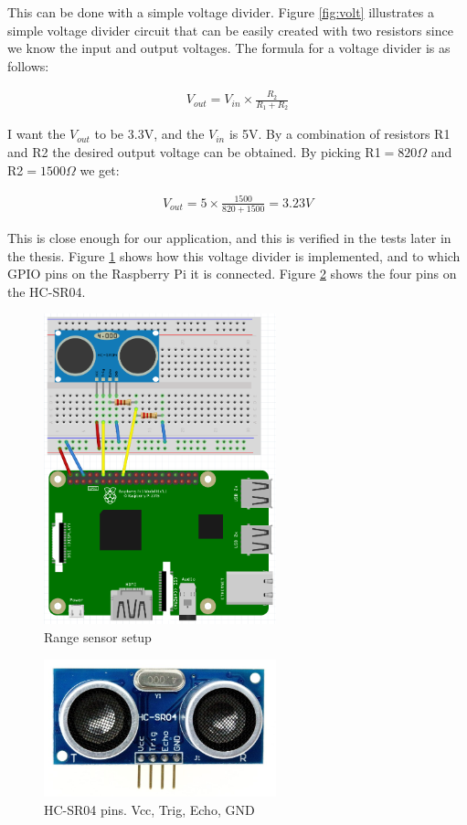This can be done with a simple voltage divider. Figure \ref{fig:volt} illustrates a simple voltage divider circuit that can be easily created with two resistors since we know the input and output voltages. The formula for a voltage divider is as follows:

\begin{align}
V_{out} = V_{in}\times \frac{R_2}{R_1 + R_2}
\end{align}

I want the $V_{out}$ to be 3.3V, and the $V_{in}$ is 5V. By a combination of resistors R1 and R2 the desired output voltage can be obtained. By picking R1$ = 820\Omega$ and R2$ = 1500\Omega$ we get:

\begin{align*}
V_{out} = 5 \times \frac{1500}{820+1500} = 3.23 V
\end{align*}

This is close enough for our application, and this is verified in the tests later in the thesis. Figure \ref{fig:rangesensor} shows how this voltage divider is implemented, and to which GPIO pins on the Raspberry Pi it is connected. Figure \ref{fig:hc2} shows the four pins on the HC-SR04.

\begin{figure}[H]
  \centering
  \includegraphics[width=0.6\textwidth]{fig/SensorSketch}
  \caption{Range sensor setup}
  \label{fig:rangesensor}
\end{figure}

\begin{figure}[H]
  \centering
  \includegraphics[width=0.6\textwidth]{fig/hc2}
  \caption{HC-SR04 pins. Vcc, Trig, Echo, GND}
  \label{fig:hc2}
\end{figure}

